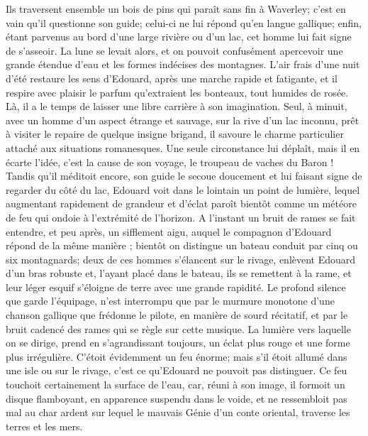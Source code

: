 Ils traversent ensemble un bois de pins qui paraît sans fin à Waverley; c'est en vain qu'il questionne son guide; celui-ci ne lui répond qu'en langue gallique; enfin, étant parvenus au bord d'une large rivière ou d'un lac, cet homme lui fait signe de s'asseoir. La lune se levait alors, et on pouvoit confusément apercevoir une grande étendue d'eau et les formes indécises des montagnes. L'air frais d'une nuit d'été restaure les sens d'Edouard, après une marche rapide et fatigante, et il respire avec plaisir le parfum qu'extraient les bonteaux, tout humides de rosée.
Là, il a le temps de laisser une libre carrière à son imagination. Seul, à minuit, avec un homme d'un aspect étrange et sauvage, sur la rive d'un lac inconnu, prêt à visiter le repaire de quelque insigne brigand, il savoure le charme particulier attaché aux situations romanesques. Une seule circonstance lui déplaît, mais il en écarte l'idée,\setcounter{page}{105} c'est la cause de son voyage, le troupeau de vaches du Baron !
Tandis qu'il méditoit encore, son guide le secoue doucement et lui faisant signe de regarder du côté du lac, Edouard voit dans le lointain un point de lumière, lequel augmentant rapidement de grandeur et d'éclat paroît bientôt comme un météore de feu qui ondoie à l'extrémité de l'horizon. A l'instant un bruit de rames se fait entendre, et peu après, un sifflement aigu, auquel le compagnon d'Edouard répond de la même manière ; bientôt on distingue un bateau conduit par cinq ou six montagnards; deux de ces hommes s'élancent sur le rivage, enlèvent Edouard d'un bras robuste et, l'ayant placé dans le bateau, ils se remettent à la rame, et leur léger esquif s'éloigne de terre avec une grande rapidité.
Le profond silence que garde l'équipage, n'est interrompu que par le murmure monotone d'une chanson gallique que frédonne le pilote, en manière de sourd récitatif, et par le bruit cadencé des rames qui se règle sur cette musique. La lumière vers laquelle on se dirige, prend en s'agrandissant toujours, un éclat plus rouge et une forme plus irrégulière. C'étoit évidemment un feu énorme;\setcounter{page}{106} mais s'il étoit allumé dans une isle ou sur le rivage, c'est ce qu'Edouard ne pouvoit pas distinguer. Ce feu touchoit certainement la surface de l'eau, car, réuni à son image, il formoit un disque flamboyant, en apparence suspendu dans le voide, et ne ressembloit pas mal au char ardent sur lequel le mauvais Génie d'un conte oriental, traverse les terres et les mers.
